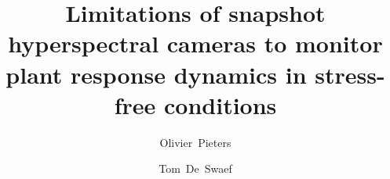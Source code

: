 \documentclass[10pt,authoryear,a4paper]{elsarticle}
\begin{document}
\begin{frontmatter}

\title{Limitations of snapshot hyperspectral cameras to monitor plant response dynamics in stress-free conditions}


\author[a,b]{Olivier~Pieters}

\author[b]{Tom~De~Swaef}


\address[a]{IDLab-AIRO -- Ghent University -- imec, Technologiepark-Zwijnaarde 126, 9052 Zwijnaarde, Belgium}
\address[b]{Plant Sciences Unit, Flanders Research Institute for Agriculture, Fisheries and Food, Caritasstraat 39, 9090 Melle, Belgium}


\end{frontmatter}
\end{document}
